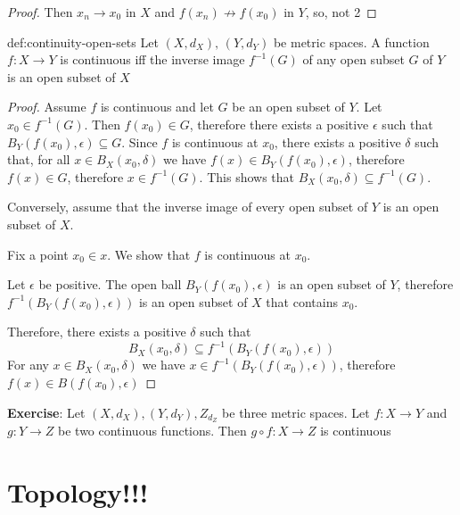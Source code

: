 \documentclass[landscape, 8pt]{extarticle}
\begin{document}
\begin{multicols}{3}
\begin{proof}
Then $x_{n}\to x_{0}$ in $X$ and $f(x_{n})\not\to f(x_{0})$ in $Y$, so, not 2
\end{proof}

\begin{thm}{def:continuity-open-sets}{}
    Let $(X, d_{X}),\,(Y, d_{Y})$ be metric spaces. A function $f: X \to Y $ is continuous iff the inverse image $f^{-1}(G)$ of any open subset $G$ of $Y$ is an open subset of $X$
\end{thm}

\begin{proof}
    Assume $f$ is continuous and let $G$ be an open subset of $Y$. Let $x_{0}\in f^{-1}(G)$. Then $f(x_{0})\in G$, therefore there exists a positive $\epsilon$ such that $B_{Y}(f(x_{0}), \epsilon)\subseteq G$. Since $f$ is continuous at $x_{0}$, there exists a positive $\delta$ such that, for all $x\in B_{X}(x_{0}, \delta)$ we have $f(x)\in B_{Y}(f(x_{0}), \epsilon)$, therefore $f(x)\in G$, therefore $x\in f^{-1}(G)$. This shows that $B_{X}(x_{0}, \delta)\subseteq f^{-1}(G)$.

    Conversely, assume that the inverse image of every open subset of $Y$ is an open subset of $X$.

    Fix a point $x_{0}\in x$. We show that $f$ is continuous at $x_{0}$.

    Let $\epsilon$ be positive. The open ball $B_{Y}(f(x_{0}), \epsilon)$ is an open subset of $Y$, therefore $f^{-1}(B_{Y}(f(x_{0}), \epsilon))$ is an open subset of $X$ that contains $x_{0}$.

    Therefore, there exists a positive $\delta$ such that
    \[B_{X}(x_{0}, \delta)\subseteq f^{-1}(B_{Y}(f(x_{0}), \epsilon))\]
    For any $x\in B_{X}(x_{0}, \delta)$ we have $x\in f^{-1}(B_{Y}(f(x_{0}), \epsilon))$, therefore $f(x)\in B(f(x_{0}), \epsilon)$
\end{proof}

\textbf{Exercise}: Let $(X, d_{X}), (Y, d_{Y}), Z_{d_{Z}}$ be three metric spaces. Let $f : X \to Y$ and $g : Y\to Z$ be two continuous functions. Then $g\circ f : X \to Z$ is continuous

\section{Topology!!!}

\end{multicols}
\end{document}
